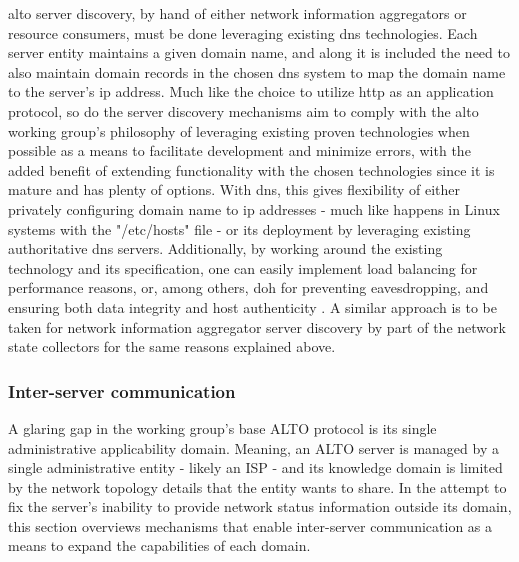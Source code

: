     \gls{alto} server discovery, by hand of either network information aggregators or resource consumers, must be done leveraging existing \gls{dns} technologies.
    Each server entity maintains a given domain name, and along it is included the need to also maintain domain records in the chosen \gls{dns} system to map the domain name to the server's \gls{ip} address.
    Much like the choice to utilize \gls{http} as an application protocol, so do the server discovery mechanisms aim to comply with the \gls{alto} working group's philosophy of leveraging existing proven technologies when possible as a means to facilitate development and minimize errors, with the added benefit of extending functionality with the chosen technologies since it is mature and has plenty of options.
    With \gls{dns}, this gives flexibility of either privately configuring domain name to \gls{ip} addresses - much like happens in Linux systems with the "/etc/hosts" file - or its deployment by leveraging existing authoritative \gls{dns} servers.
    Additionally, by working around the existing technology and its specification, one can easily implement load balancing for performance reasons, or, among others, \gls{doh} for preventing eavesdropping, and ensuring both data integrity and host authenticity \cite{dns-https}.
    A similar approach is to be taken for network information aggregator server discovery by part of the network state collectors for the same reasons explained above.

\subsubsection{Inter-server communication}
\label{ssec:multi-alto}

    A glaring gap in the working group's base ALTO protocol is its single administrative applicability domain.
    Meaning, an ALTO server is managed by a single administrative entity - likely an ISP - and its knowledge domain is limited by the network topology details that the entity wants to share.
    In the attempt to fix the server's inability to provide network status information outside its domain, this section overviews mechanisms that enable inter-server communication as a means to expand the capabilities of each domain.

